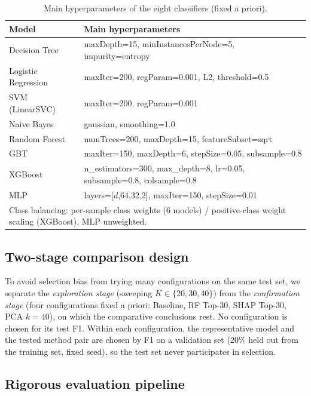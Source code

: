 \documentclass[11pt,conference,a4paper]{IEEEtran}
\begin{document}
\begin{table}[htbp]
  \caption{Main hyperparameters of the eight classifiers (fixed a priori).}
  \label{tab:hparams}
  \centering
  \footnotesize
  \begin{tabular}{ll}
    \toprule
    Model & Main hyperparameters \\
    \midrule
    Decision Tree & maxDepth=15, minInstancesPerNode=5, impurity=entropy \\
    Logistic Regression & maxIter=200, regParam=0.001, L2, threshold=0.5 \\
    SVM (LinearSVC) & maxIter=200, regParam=0.001 \\
    Naive Bayes & gaussian, smoothing=1.0 \\
    Random Forest & numTrees=200, maxDepth=15, featureSubset=sqrt \\
    GBT & maxIter=150, maxDepth=6, stepSize=0.05, subsample=0.8 \\
    XGBoost & n\_estimators=300, max\_depth=8, lr=0.05, subsample=0.8, colsample=0.8 \\
    MLP & layers=[$d$,64,32,2], maxIter=150, stepSize=0.01 \\
    \midrule
    \multicolumn{2}{l}{Class balancing: per-sample class weights (6 models) / positive-class weight scaling (XGBoost), MLP unweighted.} \\
    \bottomrule
  \end{tabular}
\end{table}

\subsection{Two-stage comparison design}

To avoid selection bias from trying many configurations on the same test set, we separate the \emph{exploration stage} (sweeping $K \in \{20,30,40\}$) from the \emph{confirmation stage} (four configurations fixed a priori: Baseline, RF Top-30, SHAP Top-30, PCA $k{=}40$), on which the comparative conclusions rest. No configuration is chosen for its test F1. Within each configuration, the representative model and the tested method pair are chosen by F1 on a validation set (20\% held out from the training set, fixed seed), so the test set never participates in selection.

\subsection{Rigorous evaluation pipeline}
\label{sec:eval}
\end{document}
